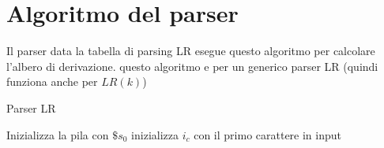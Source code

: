 \section{Algoritmo del parser}
Il parser data la tabella di parsing LR esegue questo algoritmo per calcolare l’albero di derivazione. questo
algoritmo e per un generico parser LR (quindi funziona anche per $LR(k)$)
\begin{algorithm}
        \caption{Parser LR}
        Inizializza la pila con $\$ s_0$\;
        inizializza $i_c$ con il primo carattere in input\;
\end{algorithm}